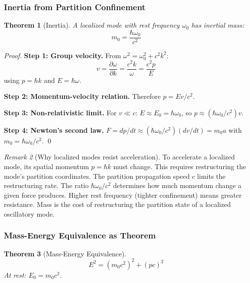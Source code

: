 \documentclass[twocolumn,10pt,a4paper]{article}
\newtheorem{theorem}{Theorem}[section]
\theoremstyle{definition}
\theoremstyle{remark}
\newtheorem{remark}[theorem]{Remark}
\begin{document}
\subsubsection{Inertia from Partition Confinement}

\begin{theorem}[Inertia]
\label{thm:inertia}
A localized mode with rest frequency $\omega_0$ has inertial mass:
\begin{equation}
    \boxed{m_0 = \frac{\hbar\omega_0}{c^2}}
    \label{eq:mass}
\end{equation}
\end{theorem}

\begin{proof}
\textbf{Step 1: Group velocity.} From $\omega^2 = \omega_0^2 + c^2k^2$:
\begin{equation}
    v = \frac{\partial\omega}{\partial k} = \frac{c^2k}{\omega} = \frac{c^2p}{E}
\end{equation}
using $p = \hbar k$ \citep{debroglie1924} and $E = \hbar\omega$.

\textbf{Step 2: Momentum-velocity relation.} Therefore $p = Ev/c^2$.

\textbf{Step 3: Non-relativistic limit.} For $v \ll c$: $E \approx E_0 = \hbar\omega_0$, so $p \approx (\hbar\omega_0/c^2)v$.

\textbf{Step 4: Newton's second law.} $F = dp/dt \approx (\hbar\omega_0/c^2)(dv/dt) = m_0 a$ with $m_0 = \hbar\omega_0/c^2$. \qed
\end{proof}

\begin{remark}[Why localized modes resist acceleration]
To accelerate a localized mode, its spatial momentum $p = \hbar k$ must change. This requires restructuring the mode's partition coordinates. The partition propagation speed $c$ limits the restructuring rate. The ratio $\hbar\omega_0/c^2$ determines how much momentum change a given force produces. Higher rest frequency (tighter confinement) means greater resistance. Mass is the cost of restructuring the partition state of a localized oscillatory mode.
\end{remark}

\subsubsection{Mass-Energy Equivalence as Theorem}

\begin{theorem}[Mass-Energy Equivalence]
\label{thm:emc2}
\begin{equation}
    E^2 = (m_0c^2)^2 + (pc)^2
\end{equation}
At rest: $E_0 = m_0c^2$.
\end{theorem}
\end{document}
